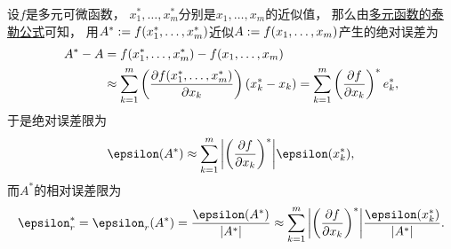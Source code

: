 设\(f\)是多元可微函数，
\(x^*_1,\dotsc,x^*_m\)分别是\(x_1,\dotsc,x_m\)的近似值，
那么由\hyperref[theorem:多元函数微分法.多元函数的泰勒公式]{多元函数的泰勒公式}可知，
用\(A^* := f(x^*_1,\dotsc,x^*_m)\)近似\(A := f(x_1,\dotsc,x_m)\)产生的绝对误差为\begin{align*}
	A^* - A
	&= f(x^*_1,\dotsc,x^*_m) - f(x_1,\dotsc,x_m) \\
	&\approx \sum_{k=1}^m \left( \pdv{f(x^*_1,\dotsc,x^*_m)}{x_k} \right) (x^*_k - x_k)
	= \sum_{k=1}^m \left( \pdv{f}{x_k} \right)^* e^*_k,
\end{align*}
于是绝对误差限为\begin{equation}
	\epsilon(A^*)
	\approx \sum_{k=1}^m \abs{\left( \pdv{f}{x_k} \right)^*} \epsilon(x^*_k),
\end{equation}
而\(A^*\)的相对误差限为\begin{equation}
	\epsilon^*_r
	= \epsilon_r(A^*)
	= \frac{\epsilon(A^*)}{\abs{A^*}}
	\approx \sum_{k=1}^m \abs{\left( \pdv{f}{x_k} \right)^*} \frac{\epsilon(x^*_k)}{\abs{A^*}}.
\end{equation}
